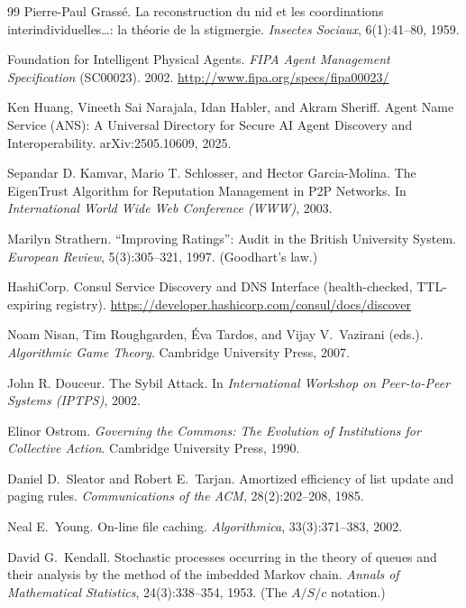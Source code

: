 \documentclass[11pt,a4paper]{article}
\theoremstyle{definition}
\theoremstyle{plain}
\begin{document}
\begin{thebibliography}{99}
Pierre-Paul Grass\'e.
\newblock La reconstruction du nid et les coordinations interindividuelles\ldots: la th\'eorie de la stigmergie.
\newblock \textit{Insectes Sociaux}, 6(1):41--80, 1959.

Foundation for Intelligent Physical Agents.
\newblock \textit{FIPA Agent Management Specification} (SC00023). 2002.
\newblock \url{http://www.fipa.org/specs/fipa00023/}

Ken Huang, Vineeth Sai Narajala, Idan Habler, and Akram Sheriff.
\newblock Agent Name Service (ANS): A Universal Directory for Secure AI Agent Discovery and Interoperability.
\newblock arXiv:2505.10609, 2025.

Sepandar D. Kamvar, Mario T. Schlosser, and Hector Garcia-Molina.
\newblock The EigenTrust Algorithm for Reputation Management in P2P Networks.
\newblock In \textit{International World Wide Web Conference (WWW)}, 2003.

Marilyn Strathern.
\newblock ``Improving Ratings'': Audit in the British University System.
\newblock \textit{European Review}, 5(3):305--321, 1997. (Goodhart's law.)

HashiCorp.
\newblock Consul Service Discovery and DNS Interface (health-checked, TTL-expiring registry).
\newblock \url{https://developer.hashicorp.com/consul/docs/discover}

Noam Nisan, Tim Roughgarden, \'Eva Tardos, and Vijay V.\ Vazirani (eds.).
\newblock \textit{Algorithmic Game Theory}. Cambridge University Press, 2007.

John R. Douceur.
\newblock The Sybil Attack.
\newblock In \textit{International Workshop on Peer-to-Peer Systems (IPTPS)}, 2002.

Elinor Ostrom.
\newblock \textit{Governing the Commons: The Evolution of Institutions for Collective Action}. Cambridge University Press, 1990.

Daniel D.\ Sleator and Robert E.\ Tarjan.
\newblock Amortized efficiency of list update and paging rules.
\newblock \textit{Communications of the ACM}, 28(2):202--208, 1985.

Neal E.\ Young.
\newblock On-line file caching.
\newblock \emph{Algorithmica}, 33(3):371--383, 2002.

David G.\ Kendall.
\newblock Stochastic processes occurring in the theory of queues and their analysis by the method of the imbedded Markov chain.
\newblock \textit{Annals of Mathematical Statistics}, 24(3):338--354, 1953. (The $A/S/c$ notation.)


\end{thebibliography}
\end{document}

